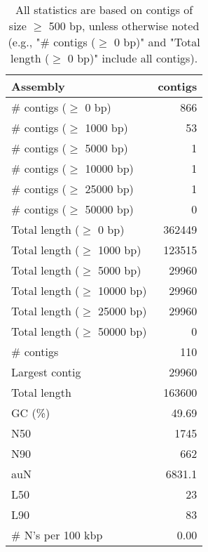 \documentclass[12pt,a4paper]{article}
\begin{document}
\begin{table}[ht]
\begin{center}
\caption{All statistics are based on contigs of size $\geq$ 500 bp, unless otherwise noted (e.g., "\# contigs ($\geq$ 0 bp)" and "Total length ($\geq$ 0 bp)" include all contigs).}
\begin{tabular}{|l*{1}{|r}|}
\hline
Assembly & contigs \\ \hline
\# contigs ($\geq$ 0 bp) & 866 \\ \hline
\# contigs ($\geq$ 1000 bp) & 53 \\ \hline
\# contigs ($\geq$ 5000 bp) & 1 \\ \hline
\# contigs ($\geq$ 10000 bp) & 1 \\ \hline
\# contigs ($\geq$ 25000 bp) & 1 \\ \hline
\# contigs ($\geq$ 50000 bp) & 0 \\ \hline
Total length ($\geq$ 0 bp) & 362449 \\ \hline
Total length ($\geq$ 1000 bp) & 123515 \\ \hline
Total length ($\geq$ 5000 bp) & 29960 \\ \hline
Total length ($\geq$ 10000 bp) & 29960 \\ \hline
Total length ($\geq$ 25000 bp) & 29960 \\ \hline
Total length ($\geq$ 50000 bp) & 0 \\ \hline
\# contigs & 110 \\ \hline
Largest contig & 29960 \\ \hline
Total length & 163600 \\ \hline
GC (\%) & 49.69 \\ \hline
N50 & 1745 \\ \hline
N90 & 662 \\ \hline
auN & 6831.1 \\ \hline
L50 & 23 \\ \hline
L90 & 83 \\ \hline
\# N's per 100 kbp & 0.00 \\ \hline
\end{tabular}
\end{center}
\end{table}
\end{document}

